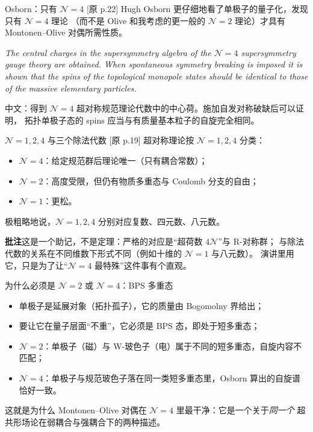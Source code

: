 \documentclass[aspectratio=169,12pt]{ctexbeamer}
\newcommand{\cN}{\mathcal{N}}
\newcommand{\srcp}[1]{{\color{black!40}\scriptsize[原 p.#1]}}
\begin{document}
\begin{frame}{Osborn：只有 $\cN=4$}
  \srcp{22} Hugh Osborn 更仔细地看了单极子的量子化，发现只有 $\cN=4$ 理论
  （而不是 Olive 和我考虑的更一般的 $\cN=2$ 理论）才具有 Montonen--Olive 对偶所需性质。
  \vspace{0.5em}
  \begin{tcolorbox}[enhanced,colback=black!3,colframe=black!3,boxrule=0pt,left=7pt,right=7pt,top=5pt,bottom=5pt,fontupper=\small]
  \emph{The central charges in the supersymmetry algebra of the $\cN=4$ supersymmetry
  gauge theory are obtained. When spontaneous symmetry breaking is imposed it is shown
  that the spins of the topological monopole states should be identical to those of the
  massive elementary particles.}
  \end{tcolorbox}
  \vspace{0.2em}
  {\small 中文：得到 $\cN=4$ 超对称规范理论代数中的中心荷。施加自发对称破缺后可以证明，
  拓扑单极子态的 spins 应当与有质量基本粒子的自旋完全相同。}
\end{frame}

\begin{frame}{$\cN=1,2,4$ 与三个除法代数}
  \srcp{19} 超对称理论按 $\cN=1,2,4$ 分类：
  \begin{itemize}
    \item $\cN=4$：给定规范群后理论唯一（只有耦合常数）；
    \item $\cN=2$：高度受限，但仍有物质多重态与 Coulomb 分支的自由；
    \item $\cN=1$：更松。
  \end{itemize}
  极粗略地说，$\cN=1,2,4$ 分别对应复数、四元数、八元数。
  \begin{beizhu}
  \textbf{批注}\quad 这是一个助记，不是定理：严格的对应是“超荷数 $4\cN$”与 R-对称群；
  与除法代数的关系在不同维数下形式不同（例如十维的 $\cN=1$ 与八元数）。
  演讲里用它，只是为了让“$\cN=4$ 最特殊”这件事有个直观。
  \end{beizhu}
\end{frame}

\begin{frame}{为什么必须是 $\cN=2$ 或 $\cN=4$：BPS 多重态}
  \begin{itemize}
    \item 单极子是延展对象（拓扑孤子），它的质量由 Bogomolny 界给出；
    \item 要让它在量子层面“不重”，它必须是 BPS 态，即处于短多重态；
    \item $\cN=2$：单极子（磁）与 W-玻色子（电）属于不同的短多重态，自旋内容不匹配；
    \item $\cN=4$：单极子与规范玻色子落在同一类短多重态里，Osborn 算出的自旋谱恰好一致。
  \end{itemize}
  \vspace{0.4em}
  这就是为什么 Montonen--Olive 对偶在 $\cN=4$ 里最干净：它是一个关于\emph{同一个}
  超共形场论在弱耦合与强耦合下的两种描述。
\end{frame}
\end{document}
